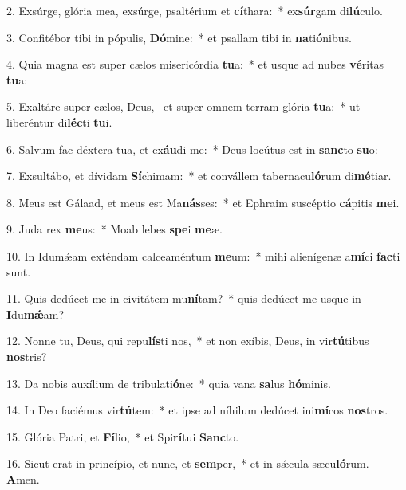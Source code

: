 2. Exsúrge, glória mea, exsúrge, psaltérium et \textbf{cí}thara:~*  ex\textbf{súr}gam di\textbf{lú}culo.\

3. Confitébor tibi in pópulis, \textbf{Dó}mine:~*  et psallam tibi in \textbf{na}ti\textbf{ó}nibus.\

4. Quia magna est super cælos misericórdia \textbf{tu}a:~*  et usque ad nubes \textbf{vé}ritas \textbf{tu}a:\

5. Exaltáre super cælos, Deus, \dag\  et super omnem terram glória \textbf{tu}a:~*  ut liberéntur di\textbf{léc}ti \textbf{tu}i.\

6. Salvum fac déxtera tua, et ex\textbf{áu}di me:~*  Deus locútus est in \textbf{sanc}to \textbf{su}o:\

7. Exsultábo, et dívidam \textbf{Sí}chimam:~*  et convállem tabernacu\textbf{ló}rum di\textbf{mé}tiar.\

8. Meus est Gálaad, et meus est Ma\textbf{nás}ses:~*  et Ephraim suscéptio \textbf{cá}pitis \textbf{me}i.\

9. Juda rex \textbf{me}us:~*  Moab lebes \textbf{spe}i \textbf{me}æ.\

10. In Idumǽam exténdam calceaméntum \textbf{me}um:~*  mihi alienígenæ a\textbf{mí}ci \textbf{fac}ti sunt.\

11. Quis dedúcet me in civitátem mu\textbf{ní}tam?~*  quis dedúcet me usque in \textbf{I}du\textbf{mǽ}am?\

12. Nonne tu, Deus, qui repu\textbf{lís}ti nos,~*  et non exíbis, Deus, in vir\textbf{tú}tibus \textbf{nos}tris?\

13. Da nobis auxílium de tribulati\textbf{ó}ne:~*  quia vana \textbf{sa}lus \textbf{hó}minis.\

14. In Deo faciémus vir\textbf{tú}tem:~*  et ipse ad níhilum dedúcet ini\textbf{mí}cos \textbf{nos}tros.\

15. Glória Patri, et \textbf{Fí}lio,~*  et Spi\textbf{rí}tui \textbf{Sanc}to.\

16. Sicut erat in princípio, et nunc, et \textbf{sem}per,~*  et in sǽcula sæcu\textbf{ló}rum. \textbf{A}men.\

